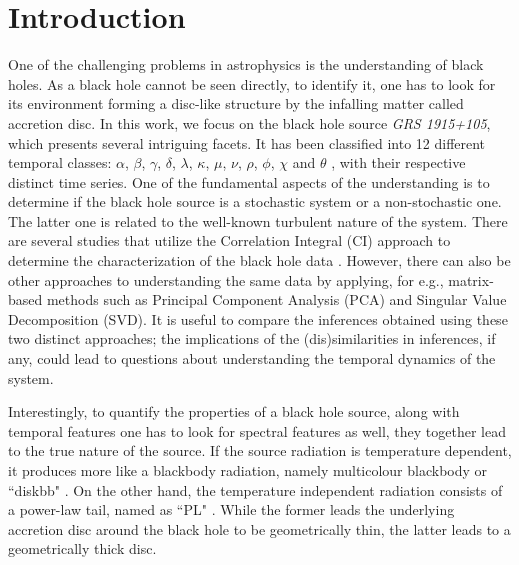 \documentclass[journal]{IEEEtran}
\begin{document}
\section{Introduction}
One of the challenging problems in astrophysics is the understanding of black holes. As a black hole cannot be seen directly, to identify it, one has to look for its environment forming a disc-like structure by the infalling matter called accretion disc. In this work, we focus on the black hole source \textit{GRS 1915+105}, which presents several intriguing facets. It has been classified into 12 different temporal classes: $\alpha$, $\beta$, $\gamma$, $\delta$, $\lambda$, $\kappa$, $\mu$, $\nu$, $\rho$, $\phi$, $\chi$ and $\theta$ \cite{Belloni2000}, with their respective distinct time series. One of the fundamental aspects of the understanding is to determine if the black hole source is a stochastic system or a non-stochastic one. The latter one is related to the well-known turbulent nature of the system. There are several studies that utilize the Correlation Integral (CI) approach to determine the characterization of the black hole data \cite{Mukhopadhyay2004, misra2006}. However, there can also be other approaches to understanding the same data by applying, for e.g.,  matrix-based methods such as Principal Component Analysis (PCA) and Singular Value Decomposition (SVD). It is useful to compare the inferences obtained using these two distinct approaches; the implications of the (dis)similarities in inferences, if any, could lead to questions about understanding the temporal dynamics of the system.

Interestingly, to quantify the properties of a black hole source, along with temporal features one has to look for spectral features as well, they together lead to the true nature of the source. If the source radiation is temperature dependent, it produces more like a blackbody radiation, namely multicolour blackbody or ``diskbb" \cite{Shakura1973}. On the other hand, the temperature independent radiation consists of a power-law tail, named as ``PL" \cite{chakrabarti1995,narayan1994}. While the former leads the underlying accretion disc around the black hole to be geometrically thin, the latter leads to a geometrically thick disc.
\end{document}

